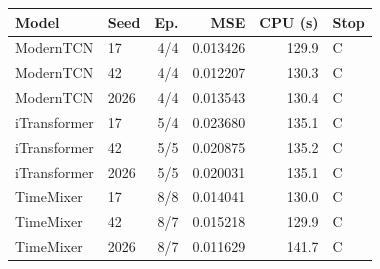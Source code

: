\begin{tabular}{llrrrl}\toprule
Model & Seed & Ep. & MSE & CPU (s) & Stop\\\midrule
ModernTCN & 17 & 4/4 & 0.013426 & 129.9 & C\\
ModernTCN & 42 & 4/4 & 0.012207 & 130.3 & C\\
ModernTCN & 2026 & 4/4 & 0.013543 & 130.4 & C\\
iTransformer & 17 & 5/4 & 0.023680 & 135.1 & C\\
iTransformer & 42 & 5/5 & 0.020875 & 135.2 & C\\
iTransformer & 2026 & 5/5 & 0.020031 & 135.1 & C\\
TimeMixer & 17 & 8/8 & 0.014041 & 130.0 & C\\
TimeMixer & 42 & 8/7 & 0.015218 & 129.9 & C\\
TimeMixer & 2026 & 8/7 & 0.011629 & 141.7 & C\\
\bottomrule\end{tabular}
